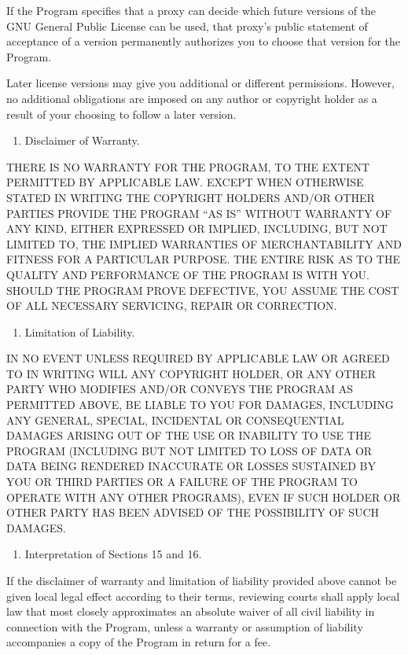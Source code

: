 \documentclass[11pt]{article}
\begin{document}
If the Program specifies that a proxy can decide which future versions of the GNU General Public License can be used, that proxy's public statement of acceptance of a version permanently authorizes you to choose that version for the Program.

Later license versions may give you additional or different permissions. However, no additional obligations are imposed on any author or copyright holder as a result of your choosing to follow a later version.

\begin{enumerate}
\item Disclaimer of Warranty.
\end{enumerate}
THERE IS NO WARRANTY FOR THE PROGRAM, TO THE EXTENT PERMITTED BY APPLICABLE LAW. EXCEPT WHEN OTHERWISE STATED IN WRITING THE COPYRIGHT HOLDERS AND/OR OTHER PARTIES PROVIDE THE PROGRAM “AS IS” WITHOUT WARRANTY OF ANY KIND, EITHER EXPRESSED OR IMPLIED, INCLUDING, BUT NOT LIMITED TO, THE IMPLIED WARRANTIES OF MERCHANTABILITY AND FITNESS FOR A PARTICULAR PURPOSE. THE ENTIRE RISK AS TO THE QUALITY AND PERFORMANCE OF THE PROGRAM IS WITH YOU. SHOULD THE PROGRAM PROVE DEFECTIVE, YOU ASSUME THE COST OF ALL NECESSARY SERVICING, REPAIR OR CORRECTION.

\begin{enumerate}
\item Limitation of Liability.
\end{enumerate}
IN NO EVENT UNLESS REQUIRED BY APPLICABLE LAW OR AGREED TO IN WRITING WILL ANY COPYRIGHT HOLDER, OR ANY OTHER PARTY WHO MODIFIES AND/OR CONVEYS THE PROGRAM AS PERMITTED ABOVE, BE LIABLE TO YOU FOR DAMAGES, INCLUDING ANY GENERAL, SPECIAL, INCIDENTAL OR CONSEQUENTIAL DAMAGES ARISING OUT OF THE USE OR INABILITY TO USE THE PROGRAM (INCLUDING BUT NOT LIMITED TO LOSS OF DATA OR DATA BEING RENDERED INACCURATE OR LOSSES SUSTAINED BY YOU OR THIRD PARTIES OR A FAILURE OF THE PROGRAM TO OPERATE WITH ANY OTHER PROGRAMS), EVEN IF SUCH HOLDER OR OTHER PARTY HAS BEEN ADVISED OF THE POSSIBILITY OF SUCH DAMAGES.

\begin{enumerate}
\item Interpretation of Sections 15 and 16.
\end{enumerate}
If the disclaimer of warranty and limitation of liability provided above cannot be given local legal effect according to their terms, reviewing courts shall apply local law that most closely approximates an absolute waiver of all civil liability in connection with the Program, unless a warranty or assumption of liability accompanies a copy of the Program in return for a fee.
\end{document}
